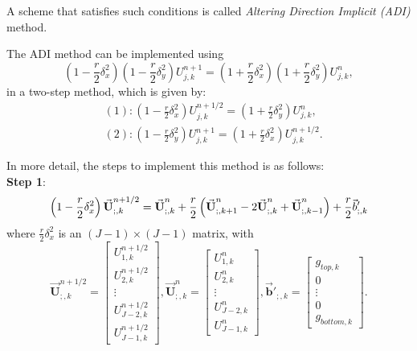 \documentclass[12pt]{article}		%
\begin{document}
A scheme that satisfies such conditions is called \textit{Altering Direction Implicit (ADI)} method. 

The ADI method can be implemented using
\[
	\left(1- \frac{r}{2}\delta^2_x \right) \left(1- \frac{r}{2}\delta^2_y \right) U_{j,k}^{n+1} =\left(1 +  \frac{r}{2}\delta^2_x \right) \left( 1+\frac{r}{2}\delta^2_y \right) U_{j,k}^n,
\]
in a two-step method, which is given by:
\begin{align*}
	&(1): \left(1- \frac{r}{2}\delta^2_x \right) U^{n+1/2}_{j,k} = \left( 1+\frac{r}{2}\delta^2_y \right) U_{j,k}^n, \\
	&(2): \left(1- \frac{r}{2}\delta^2_y \right) U_{j,k}^{n+1} = \left( 1+\frac{r}{2}\delta^2_x \right) U^{n+1/2}_{j,k}.
\end{align*}

In more detail, the steps to implement this method is as follows: \\
\textbf{Step 1}:
\begin{equation*}
	\left(1- \frac{r}{2}\delta^2_x \right) \vec{\textbf{U}}^{n+1/2}_{;,k} = \vec{\textbf{U}}_{;,k}^n + \frac{r}{2} \left(\vec{\textbf{U}}_{;,k+1}^n - 2 \vec {\textbf{U}}_{;,k}^n + \vec{\textbf{U}}_{;,k-1}^n \right) + \frac{r}{2} \vec{b}'_{;,k} \\
\end{equation*}
where $\frac{r}{2} \delta_x^2$ is an $(J-1)\times (J-1)$ matrix, with 
\begin{equation*}
	\vec{\textbf{U}}^{n+1/2}_{;,k} = \begin{bmatrix} U^{n+1/2}_{1,k} \\ U^{n+1/2}_{2,k} \\ \vdots \\ U^{n+1/2}_{J-2,k} \\ U^{n+1/2}_{J-1,k} \end{bmatrix}, 
	\vec{\textbf{U}}_{;,k}^{n} = \begin{bmatrix} U_{1,k}^{n} \\ U_{2,k}^{n} \\ \vdots \\ U_{J-2,k}^{n} \\ U_{J-1,k}^{n} \end{bmatrix}, 
	\vec{\textbf{b}}'_{;,k} = \begin{bmatrix} g_{top, k} \\ 0 \\ \vdots \\ 0 \\ g_{bottom, k} \end{bmatrix}.
\end{equation*} 
\end{document}
